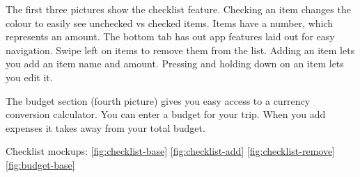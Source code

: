 \documentclass[12pt]{article}
\begin{document}
    The first three pictures show the checklist feature.
	Checking an item changes the colour to easily see unchecked vs checked items.
    Items have a number, which represents an amount.
    The bottom tab has out app features laid out for easy navigation.
    Swipe left on items to remove them from the list.
    Adding an item lets you add an item name and amount.
    Pressing and holding down on an item lets you edit it.

    The budget section (fourth picture) gives you easy access to a currency conversion calculator.
    You can enter a budget for your trip.
    When you add expenses it takes away from your total budget.



Checklist mockups: \ref{fig:checklist-base} \ref{fig:checklist-add} \ref{fig:checklist-remove} \ref{fig:budget-base}
\end{document}
